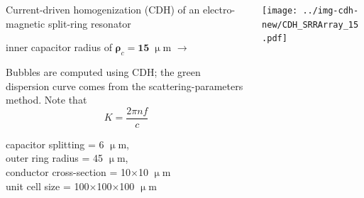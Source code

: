 \documentclass[t]{beamer} \usepackage[english]{babel} \usepackage[utf8]{inputenc} \usetheme{Frankfurt} %
\begin{document}
\begin{frame}[plain]{}%
\begin{columns}[T] %
	\begin{column}{.55\textwidth}
	\vspace{3mm}
	\noindent Current-driven homogenization (CDH) of an electro-magnetic split-ring resonator 
	\begin{exampleblock}\hfill inner capacitor radius of $\pmb\rho_c=\pmb{15}\;\upmu$m $\rightarrow$\end{exampleblock}
	\vspace{3mm}

	\noindent Bubbles are computed using CDH; the green dispersion curve comes from the scattering-parameters method. Note that $$K = \frac{2\pi n f}{c}$$
	\vspace{12mm}

	\small{capacitor splitting = 6 $\upmu$m,\\ outer ring radius = 45 $\upmu$m,\\ conductor cross-section = 10$\times$10 $\upmu$m\\ unit cell size = 100$\times$100$\times$100 $\upmu$m}
	\vspace{5mm}

	\end{column}%
	\begin{column}{.45\textwidth}%
		\vspace{-1mm}\texttt{[image: ../img-cdh-new/CDH\_SRRArray\_15.pdf]} 
	\end{column}
\end{columns}
\end{frame} 		%
% 
\end{document}
